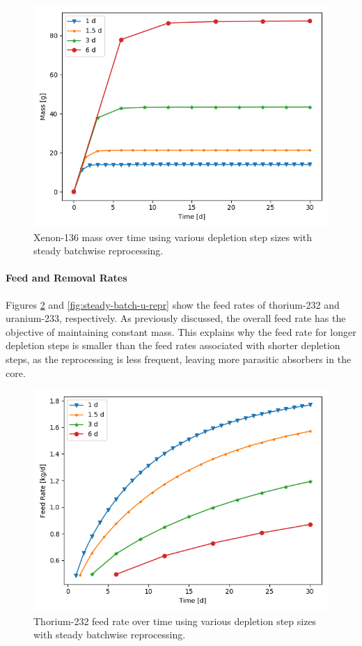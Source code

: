 \begin{figure}[H]
  \centering
  \includegraphics[scale=0.7]{images/Xe136_sp_comp.png}
  \caption{Xenon-136 mass over time using various depletion step sizes with steady batchwise reprocessing.}
   \label{fig:steady-batch-xe136}
\end{figure}

\paragraph{Feed and Removal Rates}

Figures \ref{fig:steady-batch-th-repr} and \ref{fig:steady-batch-u-repr} show the feed rates of thorium-232 and uranium-233, respectively. As previously discussed, the overall feed rate has the objective of maintaining constant mass. This explains why the feed rate for longer depletion steps is smaller than the feed rates associated with shorter depletion steps, as the reprocessing is less frequent, leaving more parasitic absorbers in the core. 

\begin{figure}[H]
  \centering
  \includegraphics[scale=0.7]{images/feed_Th232_6d_sp_comp.png}
  \caption{Thorium-232 feed rate over time using various depletion step sizes with steady batchwise reprocessing.}
   \label{fig:steady-batch-th-repr}
\end{figure}

